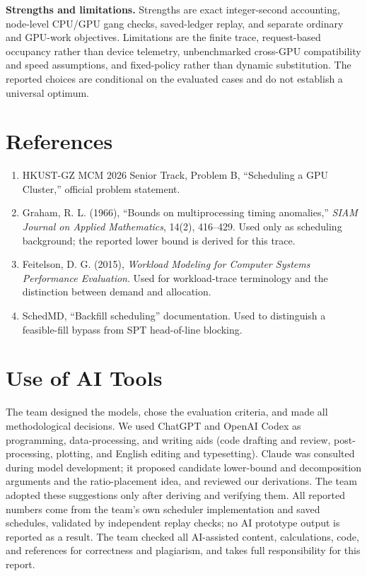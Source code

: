 \textbf{Strengths and limitations.} Strengths are exact integer-second accounting, node-level CPU/GPU gang checks, saved-ledger replay, and separate ordinary and GPU-work objectives. Limitations are the finite trace, request-based occupancy rather than device telemetry, unbenchmarked cross-GPU compatibility and speed assumptions, and fixed-policy rather than dynamic substitution. The reported choices are conditional on the evaluated cases and do not establish a universal optimum.

\section*{References}
\begin{enumerate}
\item HKUST-GZ MCM 2026 Senior Track, Problem B, ``Scheduling a GPU Cluster,'' official problem statement.
\item Graham, R. L. (1966), ``Bounds on multiprocessing timing anomalies,'' \emph{SIAM Journal on Applied Mathematics}, 14(2), 416--429. Used only as scheduling background; the reported lower bound is derived for this trace.
\item Feitelson, D. G. (2015), \emph{Workload Modeling for Computer Systems Performance Evaluation}. Used for workload-trace terminology and the distinction between demand and allocation.
\item SchedMD, ``Backfill scheduling'' documentation. Used to distinguish a feasible-fill bypass from SPT head-of-line blocking.
\end{enumerate}

\section*{Use of AI Tools}
The team designed the models, chose the evaluation criteria, and made all methodological decisions. We used ChatGPT and OpenAI Codex as programming, data-processing, and writing aids (code drafting and review, post-processing, plotting, and English editing and typesetting). Claude was consulted during model development; it proposed candidate lower-bound and decomposition arguments and the ratio-placement idea, and reviewed our derivations. The team adopted these suggestions only after deriving and verifying them. All reported numbers come from the team's own scheduler implementation and saved schedules, validated by independent replay checks; no AI prototype output is reported as a result. The team checked all AI-assisted content, calculations, code, and references for correctness and plagiarism, and takes full responsibility for this report.

